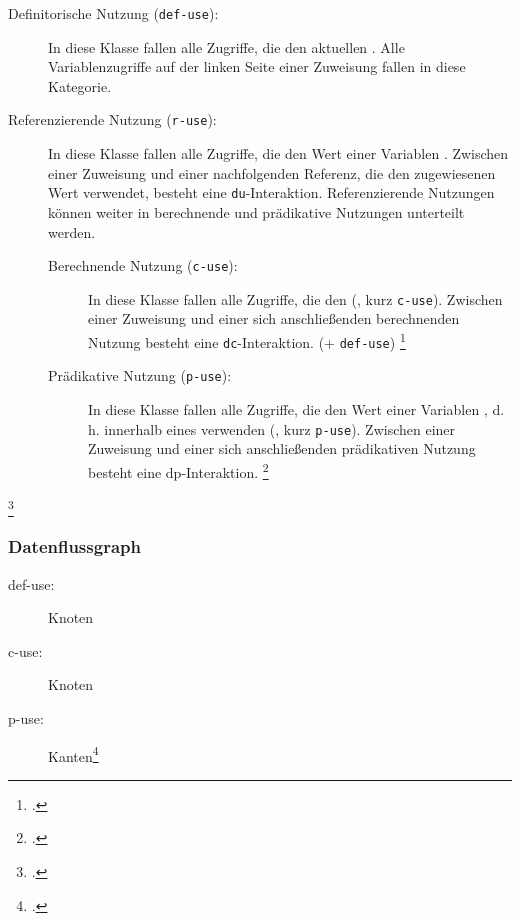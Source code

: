 \documentclass{lehramt-informatik-haupt}
\begin{document}
\begin{description}
\item[Definitorische Nutzung (\texttt{def-use}):]

In diese Klasse fallen alle Zugriffe, die den aktuellen . Alle Variablenzugriffe auf der linken
Seite einer Zuweisung fallen in diese Kategorie. 

\item[Referenzierende Nutzung (\texttt{r-use}):]

In diese Klasse fallen alle Zugriffe, die den Wert einer Variablen
. Zwischen einer Zuweisung und
einer nachfolgenden Referenz, die den zugewiesenen Wert verwendet,
besteht eine \texttt{du}-Interaktion. Referenzierende Nutzungen können
weiter in berechnende und prädikative Nutzungen unterteilt werden.

\begin{description}
\item[Berechnende Nutzung (\texttt{c-use}):]

In diese Klasse fallen alle Zugriffe, die den  (,
kurz \texttt{c-use}). Zwischen einer Zuweisung und einer sich
anschließenden berechnenden Nutzung besteht eine
\texttt{dc}-Interaktion.  (+ \texttt{def-use})
\footcite[Seite 220]{hoffmannn}

\item[Prädikative Nutzung (\texttt{p-use}):]

In diese Klasse fallen alle Zugriffe, die den Wert einer Variablen
, d. h. innerhalb eines 
verwenden (, kurz \texttt{p-use}). Zwischen einer
Zuweisung und einer sich anschließenden prädikativen Nutzung besteht
eine dp-Interaktion. 
\footcite[Seite 221]{hoffmannn}
\end{description}
\end{description}
\footcite[Seite 42]{sosy:fs:5}

%

\subsubsection{Datenflussgraph}


\begin{description}
\item[def-use:] Knoten
\item[c-use:] Knoten
\item[p-use:] Kanten\footcite[Seite 43]{sosy:fs:5}
\end{description}
\end{document}
